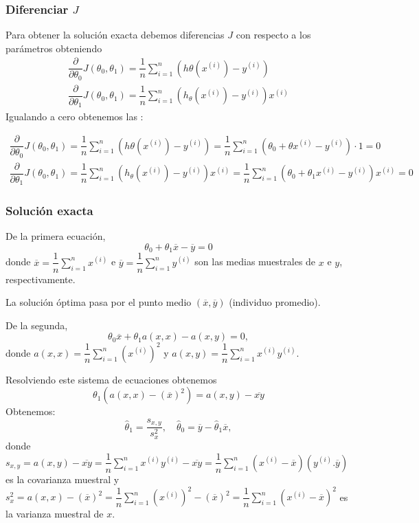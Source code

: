 \subsubsection{Diferenciar $J$}

Para obtener la solución exacta debemos diferencias $J$ con respecto a los parámetros obteniendo \[ \begin{array}{l}
	\dfrac{\partial}{\partial \theta_0}J(\theta_0,\theta_1)=\dfrac{1}{n}\sum_{i=1}^{n}\left(h\theta\left(x^{(i)}\right)-y^{(i)}\right)\\
	\dfrac{\partial}{\partial\theta_1}J(\theta_0,\theta_1)=\dfrac{1}{n}\sum_{i=1}^{n}\left(h_\theta\left(x^{(i)}\right)-y^{(i)}\right)x^{(i)}
\end{array} \]
Igualando a cero obtenemos las :

$\begin{array}{l}
	\dfrac{\partial}{\partial \theta_0}J(\theta_0,\theta_1)=\dfrac{1}{n}\sum_{i=1}^{n}\left(h\theta\left(x^{(i)}\right)-y^{(i)}\right)=\dfrac{1}{n}\sum_{i=1}^{n}\left(\theta_0+\theta x^{(i)}-y^{(i)}\right)\cdot1=0\\
	\dfrac{\partial}{\partial\theta_1}J(\theta_0,\theta_1)=\dfrac{1}{n}\sum_{i=1}^{n}\left(h_\theta\left(x^{(i)}\right)-y^{(i)}\right)x^{(i)}=\dfrac{1}{n}\sum_{i=1}^{n}\left(\theta_0+\theta_1x^{(i)}-y^{(i)}\right)x^{(i)}=0
\end{array}$
\subsubsection{Solución exacta}
De la primera ecuación, \[ \theta_0+\theta_1\overline{x}-\overline{y}=0 \]donde $\overline{x}=\dfrac{1}{n}\sum_{i=1}^{n}x^{(i)}$ e $\overline{y}=\dfrac{1}{n}\sum_{i=1}^{n}y^{(i)}$ son las medias muestrales de $x$ e $y$, respectivamente.

La solución óptima pasa por el punto medio $(\overline{x},\overline{y})$ (individuo promedio).

De la segunda, \[ \theta_0\overline{x}+\theta_1a(x,x)-a(x,y)=0,\] donde $a(x,x)=\dfrac{1}{n}\sum_{i=1}^{n}\left(x^{(i)}\right)^2$ y $a(x,y)=\dfrac{1}{n}\sum_{i=1}^{n}x^{(i)}y^{(i)}$.

Resolviendo este sistema de ecuaciones obtenemos \[ \theta_1\left(a(x,x)-(\overline{x})^2\right)=a(x,y)-\overline{xy} \]
Obtenemos: \[ \hat{\theta}_1=\dfrac{s_{x,y}}{s_x^2},\quad \hat{\theta}_0=\overline{y}-\hat{\theta}_1\overline{x}, \] donde $s_{x,y}=a(x,y)-\overline{xy}=\dfrac{1}{n}\sum_{i=1}^{n}x^{(i)}y^{(i)}-\overline{xy}=\dfrac{1}{n}\sum_{i=1}^{n}\left(x^{(i)}-\overline{x}\right)\left(y^{(i)}.\overline{y}\right)$ es la covarianza muestral y $s_x^2=a(x,x)-(\overline{x})^2=\dfrac{1}{n}\sum_{i=1}^{n}\left(x^{(i)}\right)^2-(\overline{x})^2=\dfrac{1}{n}\sum_{i=1}^{n}\left(x^{(i)}-\overline{x}\right)^2$ es la varianza muestral de $x$.

